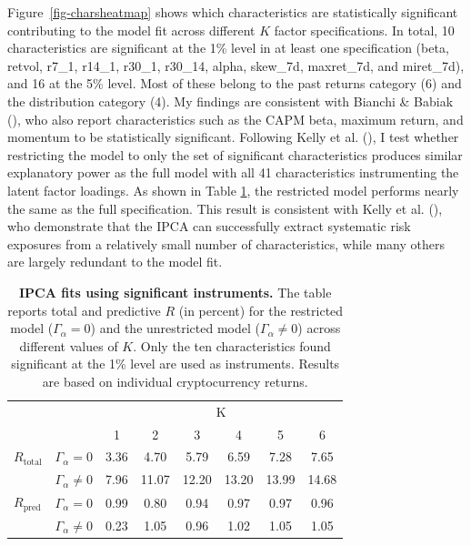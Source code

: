 \documentclass[
  12pt,
  a4paper,
  openany]{scrbook}
\begin{document}
Figure~\ref{fig-charsheatmap} shows which characteristics are
statistically significant contributing to the model fit across different
\(K\) factor specifications. In total, 10 characteristics are
significant at the 1\% level in at least one specification (beta,
retvol, r7\_1, r14\_1, r30\_1, r30\_14, alpha, skew\_7d, maxret\_7d, and
miret\_7d), and 16 at the 5\% level. Most of these belong to the past
returns category (6) and the distribution category (4). My findings are
consistent with Bianchi \& Babiak
(), who also
report characteristics such as the CAPM beta, maximum return, and
momentum to be statistically significant. Following Kelly et al.
(), I test whether
restricting the model to only the set of significant characteristics
produces similar explanatory power as the full model with all 41
characteristics instrumenting the latent factor loadings. As shown in
Table \ref{tbl-ipca_signchars}, the restricted model performs nearly the
same as the full specification. This result is consistent with Kelly et
al. (), who demonstrate
that the IPCA can successfully extract systematic risk exposures from a
relatively small number of characteristics, while many others are
largely redundant to the model fit.

\begin{table}[h]
\centering
\small
\caption[IPCA fits using significant instruments]%
{%
\textbf{IPCA fits using significant instruments.}
The table reports total and predictive $R$ (in percent) for the restricted model ($\Gamma_\alpha = 0$) and the unrestricted model ($\Gamma_\alpha \neq 0$) across different values of $K$. Only the ten characteristics found significant at the 1\% level are used as instruments. Results are based on individual cryptocurrency returns.
}
\label{tbl-ipca_signchars}
\vspace{5pt} %
\begin{tabular}{lccccccc}
\toprule
 &  & \multicolumn{6}{c}{K} \\
\cmidrule(lr){3-8}
 &  & 1 & 2 & 3 & 4 & 5 & 6 \\
\midrule\addlinespace[2.5pt]
$R_{\text{total}}$      & $\Gamma_{\alpha} = 0$     & 3.36 & 4.70 & 5.79 & 6.59 & 7.28 & 7.65 \\
                        & $\Gamma_{\alpha} \neq 0$  & 7.96 & 11.07 & 12.20 & 13.20 & 13.99 & 14.68 \\
$R_{\text{pred}}$       & $\Gamma_{\alpha} = 0$     & 0.99 & 0.80 & 0.94 & 0.97 & 0.97 & 0.96 \\
                        & $\Gamma_{\alpha} \neq 0$  & 0.23 & 1.05 & 0.96 & 1.02 & 1.05 & 1.05 \\
\bottomrule
\end{tabular}
\end{table}
\end{document}
